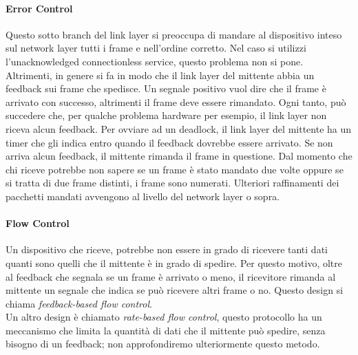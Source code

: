 \documentclass{article}
\begin{document}
\paragraph{Error Control}
Questo sotto branch del link layer si preoccupa di mandare al dispositivo inteso
sul network layer tutti i frame e nell'ordine corretto. Nel caso si utilizzi
l'unacknowledged connectionless service, questo problema non si pone.
Altrimenti, in genere si fa in modo che il link layer del mittente abbia un
feedback sui frame che spedisce. Un segnale positivo vuol dire che il frame è
arrivato con successo, altrimenti il frame deve essere rimandato. Ogni tanto, può
succedere che, per qualche problema hardware per esempio, il link layer non
riceva alcun feedback. Per ovviare ad un deadlock, il link layer del mittente ha
un timer che gli indica entro quando il feedback dovrebbe essere arrivato. Se
non arriva alcun feedback, il mittente rimanda il frame in questione. Dal
momento che chi riceve potrebbe non sapere se un frame è stato mandato due volte
oppure se si tratta di due frame distinti, i frame sono numerati. Ulteriori
raffinamenti dei pacchetti mandati avvengono al livello del network layer o
sopra.

\paragraph{Flow Control}
Un dispositivo che riceve, potrebbe non essere in grado di ricevere tanti dati
quanti sono quelli che il mittente è in grado di spedire. Per questo motivo,
oltre al feedback che segnala se un frame è arrivato o meno, il ricevitore
rimanda al mittente un segnale che indica se può ricevere altri frame o no.
Questo design si chiama \textit{feedback-based flow control}.\\
Un altro design è chiamato \textit{rate-based flow control}, questo protocollo
ha un meccanismo che limita la quantità di dati che il mittente può spedire,
senza bisogno di un feedback; non approfondiremo ulteriormente questo metodo.
\end{document}
